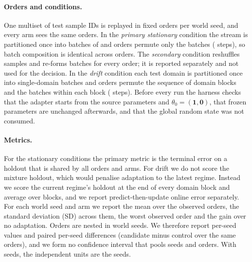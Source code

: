 \paragraph{Orders and conditions.} One multiset of test sample IDs is replayed in  fixed orders
per world seed, and every arm sees the same orders. In the \emph{primary stationary} condition the stream is
partitioned once into batches of  and orders permute only the batches ( steps),
so batch composition is identical across orders. The \emph{secondary} condition reshuffles samples and
re-forms batches for every order; it is reported separately and not used for the decision. In the
\emph{drift} condition each test domain is partitioned once into single-domain batches and orders permute the
sequence of domain blocks and the batches within each block ( steps). Before every run the
harness checks that the adapter starts from the source parameters and $\theta_0=(\mathbf{1},\mathbf{0})$,
that frozen parameters are unchanged afterwards, and that the global random state was not consumed.

\paragraph{Metrics.} For the stationary conditions the primary metric is the terminal error on a holdout that
is shared by all orders and arms. For drift we do not score the mixture holdout, which would penalise
adaptation to the latest regime. Instead we score the current regime's holdout at the end of every domain
block and average over blocks, and we report predict-then-update online error separately. For each world seed
and arm we report the mean over the observed orders, the standard deviation (SD) across them, the worst
observed order and the gain over no adaptation. Orders are nested in world seeds. We therefore report
per-seed values and paired per-seed differences (candidate minus control over the same orders), and we form
no confidence interval that pools seeds and orders. With  seeds, the independent units are the
seeds.

